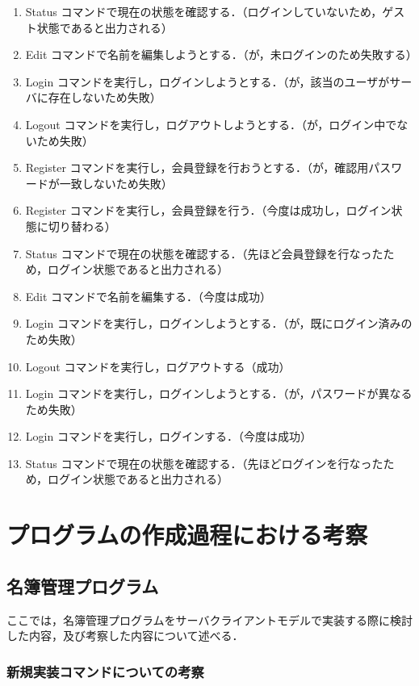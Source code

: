 \documentclass[11pt]{jsarticle}
\begin{document}
\begin{enumerate}
      \item Status コマンドで現在の状態を確認する．（ログインしていないため，ゲスト状態であると出力される）
      \item Edit コマンドで名前を編集しようとする．（が，未ログインのため失敗する）
      \item Login コマンドを実行し，ログインしようとする．（が，該当のユーザがサーバに存在しないため失敗）
      \item Logout コマンドを実行し，ログアウトしようとする．（が，ログイン中でないため失敗）
      \item Register コマンドを実行し，会員登録を行おうとする．（が，確認用パスワードが一致しないため失敗）
      \item Register コマンドを実行し，会員登録を行う．（今度は成功し，ログイン状態に切り替わる）
      \item Status コマンドで現在の状態を確認する．（先ほど会員登録を行なったため，ログイン状態であると出力される）
      \item Edit コマンドで名前を編集する．（今度は成功）
      \item Login コマンドを実行し，ログインしようとする．（が，既にログイン済みのため失敗）
      \item Logout コマンドを実行し，ログアウトする（成功）
      \item Login コマンドを実行し，ログインしようとする．（が，パスワードが異なるため失敗）
      \item Login コマンドを実行し，ログインする．（今度は成功）
      \item Status コマンドで現在の状態を確認する．（先ほどログインを行なったため，ログイン状態であると出力される）
\end{enumerate}


\section{プログラムの作成過程における考察}

\subsection{名簿管理プログラム}

ここでは，名簿管理プログラムをサーバクライアントモデルで実装する際に検討した内容，及び考察した内容について述べる．

\subsubsection{新規実装コマンドについての考察}
\end{document}
